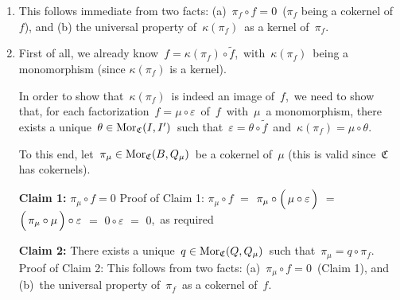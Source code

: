 \begin{enumerate}
\item
	This follows immediate from two facts:
	(a)	\,$\pi_{f} \circ f = 0$\, ($\pi_{f}$ being a cokernel of $f$), and
	(b)	the universal property of \,$\kappa(\pi_{f})$\, as a kernel of \,$\pi_{f}$.\,
\item
	First of all, we already know \,$f = \kappa(\pi_{f}) \circ \widetilde{f}$,\,
	with \,$\kappa(\pi_{f})$\, being a monomorphism (since $\kappa(\pi_{f})$ is a kernel).
	\begin{center}
	\end{center}
	In order to show that \,$\kappa(\pi_{f})$\, is indeed an image of \,$f$,\,
	we need to show that, for each factorization \,$f = \mu \circ \varepsilon$\, of \,$f$\,
	with \,$\mu$\, a monomorphism, there exists a unique \,$\theta \in \textnormal{Mor}_{\mathfrak{C}}(I,I^{\prime})$\,
	such that \,$\varepsilon = \theta \circ \widetilde{f}$\, and \,$\kappa(\pi_{f}) = \mu \circ \theta$.
	
	\vskip 0.1cm
	\noindent
	To this end, let \,$\pi_{\mu} \in \textnormal{Mor}_{\mathfrak{C}}(B,Q_{\mu})$\, be a cokernel of \,$\mu$
	(this is valid since \,$\mathfrak{C}$\, has cokernels).\,

	\vskip 0.3cm
	\noindent
	\textbf{Claim 1:}\;\; $\pi_{\mu} \circ f = 0$
	\vskip -0.1cm
	\noindent
	Proof of Claim 1:\;
	$\pi_{\mu} \circ f$
	\;$=$\; $\pi_{\mu} \circ \left(\,\mu \overset{{\color{white}1}}{\circ}\varepsilon\,\right)$
	\;$=$\; $\left(\,\pi_{\mu} \overset{{\color{white}1}}{\circ} \mu \,\right) \circ \varepsilon$
	\;$=$\; $0 \circ \varepsilon$
	\;$=$\; $0$,\,
	as required

	\vskip 0.3cm
	\noindent
	\textbf{Claim 2:}\;\; There exists a unique \,$q \in \textnormal{Mor}_{\mathfrak{C}}(Q,Q_{\mu})$\,
	such that \,$\pi_{\mu} = q \circ \pi_{f}$.\,
	\vskip 0.05cm
	\noindent
	Proof of Claim 2:\;
	This follows from two facts:\;
	(a)	\,$\pi_{\mu} \circ f = 0$\, (Claim 1), and
	(b)	\,the universal property of \,$\pi_{f}$\, as a cokernel of \,$f$.\,


\end{enumerate}
